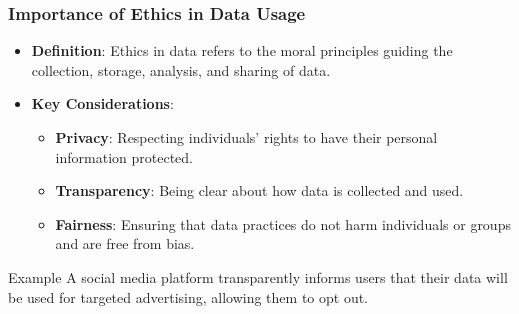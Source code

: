 \documentclass{beamer}
\begin{document}
\begin{frame}[fragile]
    \frametitle{Importance of Ethics in Data Usage}
    \begin{itemize}
        \item \textbf{Definition}: Ethics in data refers to the moral principles guiding the collection, storage, analysis, and sharing of data.
        \item \textbf{Key Considerations}:
        \begin{itemize}
            \item \textbf{Privacy}: Respecting individuals’ rights to have their personal information protected.
            \item \textbf{Transparency}: Being clear about how data is collected and used.
            \item \textbf{Fairness}: Ensuring that data practices do not harm individuals or groups and are free from bias.
        \end{itemize}
    \end{itemize}
    \begin{block}{Example}
        A social media platform transparently informs users that their data will be used for targeted advertising, allowing them to opt out.
    \end{block}
\end{frame}
\end{document}
